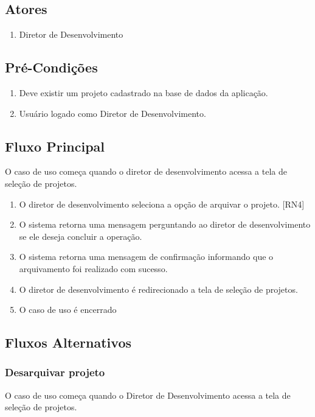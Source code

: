 \subsection{Atores}

\begin{enumerate}
  \item Diretor de Desenvolvimento
\end{enumerate}

\subsection{Pré-Condições}
\begin{enumerate}
  \item Deve existir um projeto cadastrado na base de dados da aplicação.
  \item Usuário logado como Diretor de Desenvolvimento.
\end{enumerate}

\subsection{Fluxo Principal}
O caso de uso começa quando o diretor de desenvolvimento acessa a tela de seleção de projetos.

\begin{enumerate}
  \item O diretor de desenvolvimento seleciona a opção de arquivar o projeto. [RN4]
  \item O sistema retorna uma mensagem perguntando ao diretor de desenvolvimento se ele deseja concluir a operação.
  \item O sistema retorna uma mensagem de confirmação informando que o arquivamento foi realizado com sucesso.
  \item O diretor de desenvolvimento é redirecionado a tela de seleção de projetos.
  \item O caso de uso é encerrado
\end{enumerate}

\subsection{Fluxos Alternativos}

\subsubsection{Desarquivar projeto}
O caso de uso começa quando o Diretor de Desenvolvimento acessa a tela de seleção de projetos.


